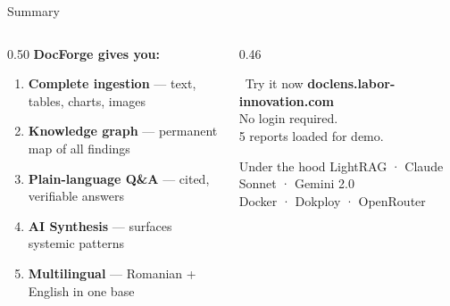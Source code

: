 \documentclass[aspectratio=169,11pt]{beamer}
\begin{document}
\begin{frame}{Summary}
  \vspace{0.2cm}
  \begin{columns}[t]
    \begin{column}{0.50\textwidth}
      \textbf{DocForge gives you:}\\[8pt]
      \begin{enumerate}\setlength\itemsep{9pt}
        \item \textbf{Complete ingestion} — text, tables, charts, images
        \item \textbf{Knowledge graph} — permanent map of all findings
        \item \textbf{Plain-language Q\&A} — cited, verifiable answers
        \item \textbf{AI Synthesis} — surfaces systemic patterns
        \item \textbf{Multilingual} — Romanian + English in one base
      \end{enumerate}
    \end{column}
    \begin{column}{0.46\textwidth}
      \begin{alertblock}{\faGlobe\ Try it now}
        \centering\medskip
        \textbf{doclens.labor-innovation.com}\\[6pt]
        {\small No login required.\\
         5 reports loaded for demo.}
        \medskip
      \end{alertblock}
      \vspace{0.5em}
      \begin{block}{Under the hood}
        {\small
         LightRAG · Claude Sonnet · Gemini 2.0\\
         Docker · Dokploy · OpenRouter}
      \end{block}
    \end{column}
  \end{columns}
\end{frame}

\end{document}
